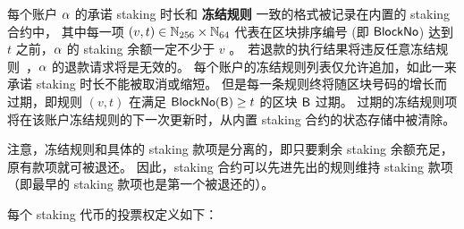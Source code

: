 每个账户 $\mathbf{\alpha}$ 的承诺 staking 时长和 {\bf 冻结规则} 一致的格式被记录在内置的 staking 合约中，
其中每一项 $(v,t)\in \mathbb{N}_{256}\times\mathbb{N}_{64}$ 代表在区块排序编号 (即 $\mathsf{BlockNo}$) 达到 $t$ 之前，$\mathbf{\alpha}$ 的 staking 余额一定不少于 $v$ \unit。
若退款的执行结果将违反任意冻结规则，$\mathbf{\alpha}$ 的退款请求将是无效的。
每个账户的冻结规则列表仅允许追加，如此一来承诺 staking 时长不能被取消或缩短。
但是每一条规则终将随区块号码的增长而过期，即规则 $(v,t)$ 在满足 $\mathsf{BlockNo}(\textsf{B})\ge t$ 的区块 $\textsf{B}$ 过期。
过期的冻结规则项将在该账户冻结规则的下一次更新时，从内置 staking 合约的状态存储中被清除。

注意，冻结规则和具体的 staking 款项是分离的，即只要剩余 staking 余额充足，原有款项就可被退还。
因此，staking 合约可以先进先出的规则维持 staking 款项（即最早的 staking 款项也是第一个被退还的）。


每个 staking 代币的投票权定义如下：

